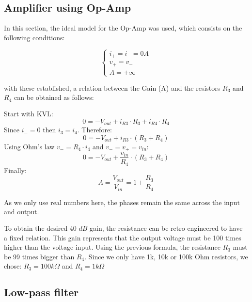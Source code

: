 \subsection{Amplifier using Op-Amp}

\indent

In this section, the ideal model for the Op-Amp was used, which consists on the following conditions:

\begin{equation}
    \begin{cases}
      i_+=i_-=0 A \\
      v_+=v_- \\
      A = +\infty
    \end{cases}
\end{equation}

with these established, a relation between the Gain (A) and the resistors $R_3$ and $R_4$ can be obtained as follows:

Start with KVL:
\begin{equation}
    0 =-V_{out} + i_{R3}\cdot R_3 + i_{R4}\cdot R_4
\end{equation}
Since $i_-=0$ then $i_3=i_4$. Therefore:
\begin{equation}
    0 = -V_{out} + i_{R3}\cdot (R_3 + R_4)
\end{equation}
Using Ohm's law $v_- = R_4\cdot i_4$ and $v_-=v_+=v_{in}$:
\begin{equation}
    0 = -V_{out} + \frac{v_{in}}{R_4}\cdot (R_3 + R_4)
\end{equation}
Finally:
\begin{equation}
     A = \frac{V_{out}}{V_{in}} = 1 + \frac{R_3}{R_4}
\end{equation}

As we only use real numbers here, the phases remain the same across the input and output.

To obtain the desired 40 $dB$ gain, the resistance can be retro engineered to have a fixed relation. This gain represents that the output voltage must be 100 times higher than the voltage input. Using the previous formula, the resistance $R_3$ must be 99 times bigger than $R_4$. Since we only have 1k, 10k or 100k Ohm resistors, we chose: $R_3= 100k\Omega$ and $R_4= 1k\Omega$ 

\subsection{Low-pass filter}

\indent

